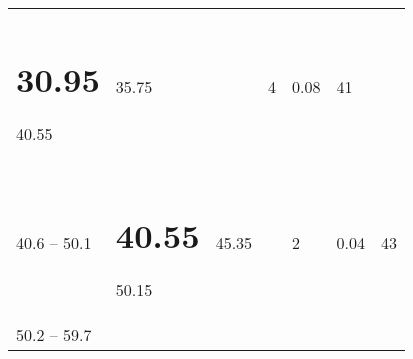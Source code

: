 \documentclass[]{book}
\begin{document}
\begin{longtable}[]{@{}lllllll@{}}
\begin{minipage}[t]{0.11\columnwidth}
{\section{30.95}\label{section-2}}

40.55\strut
\end{minipage} & \begin{minipage}[t]{0.11\columnwidth}\raggedright
35.75\strut
\end{minipage} & \begin{minipage}[t]{0.11\columnwidth}\raggedright
~\strut
\end{minipage} & \begin{minipage}[t]{0.11\columnwidth}\raggedright
4\strut
\end{minipage} & \begin{minipage}[t]{0.11\columnwidth}\raggedright
0.08\strut
\end{minipage} & \begin{minipage}[t]{0.11\columnwidth}\raggedright
41\strut
\end{minipage}\tabularnewline
\begin{minipage}[t]{0.11\columnwidth}\raggedright
40.6 --
50.1\strut
\end{minipage} & \begin{minipage}[t]{0.11\columnwidth}\raggedright
\hypertarget{section-3}{%
\section{40.55}\label{section-3}}

50.15\strut
\end{minipage} & \begin{minipage}[t]{0.11\columnwidth}\raggedright
45.35\strut
\end{minipage} & \begin{minipage}[t]{0.11\columnwidth}\raggedright
\strut
\end{minipage} & \begin{minipage}[t]{0.11\columnwidth}\raggedright
2\strut
\end{minipage} & \begin{minipage}[t]{0.11\columnwidth}\raggedright
0.04\strut
\end{minipage} & \begin{minipage}[t]{0.11\columnwidth}\raggedright
43\strut
\end{minipage}\tabularnewline
\begin{minipage}[t]{0.11\columnwidth}\raggedright
50.2 --
59.7\strut
\end{minipage} & \begin{minipage}[t]{0.11\columnwidth}\raggedright
\hypertarget{section-4}{%
}
\end{minipage}
\end{longtable}
\end{document}
